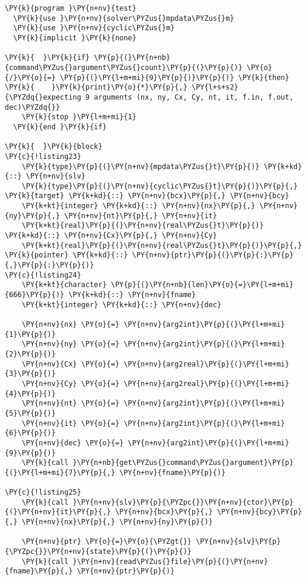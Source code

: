 \begin{Verbatim}[commandchars=\\\{\}]
\PY{k}{program }\PY{n+nv}{test}
  \PY{k}{use }\PY{n+nv}{solver\PYZus{}mpdata\PYZus{}m}
  \PY{k}{use }\PY{n+nv}{cyclic\PYZus{}m}
  \PY{k}{implicit }\PY{k}{none}

\PY{k}{  }\PY{k}{if} \PY{p}{(}\PY{n+nb}{command\PYZus{}argument\PYZus{}count}\PY{p}{(}\PY{p}{)} \PY{o}{/}\PY{o}{=} \PY{p}{(}\PY{l+m+mi}{9}\PY{p}{)}\PY{p}{)} \PY{k}{then}
\PY{k}{    }\PY{k}{print}\PY{o}{*}\PY{p}{,} \PY{l+s+s2}{\PYZdq{}expecting 9 arguments (nx, ny, Cx, Cy, nt, it, f.in, f.out, dec)\PYZdq{}}
    \PY{k}{stop }\PY{l+m+mi}{1}
  \PY{k}{end }\PY{k}{if}

\PY{k}{  }\PY{k}{block}
\PY{c}{!listing23}
    \PY{k}{type}\PY{p}{(}\PY{n+nv}{mpdata\PYZus{}t}\PY{p}{)} \PY{k+kd}{::} \PY{n+nv}{slv}
    \PY{k}{type}\PY{p}{(}\PY{n+nv}{cyclic\PYZus{}t}\PY{p}{)}\PY{p}{,} \PY{k}{target} \PY{k+kd}{::} \PY{n+nv}{bcx}\PY{p}{,} \PY{n+nv}{bcy}
    \PY{k+kt}{integer} \PY{k+kd}{::} \PY{n+nv}{nx}\PY{p}{,} \PY{n+nv}{ny}\PY{p}{,} \PY{n+nv}{nt}\PY{p}{,} \PY{n+nv}{it}
    \PY{k+kt}{real}\PY{p}{(}\PY{n+nv}{real\PYZus{}t}\PY{p}{)} \PY{k+kd}{::} \PY{n+nv}{Cx}\PY{p}{,} \PY{n+nv}{Cy}
    \PY{k+kt}{real}\PY{p}{(}\PY{n+nv}{real\PYZus{}t}\PY{p}{)}\PY{p}{,} \PY{k}{pointer} \PY{k+kd}{::} \PY{n+nv}{ptr}\PY{p}{(}\PY{p}{:}\PY{p}{,}\PY{p}{:}\PY{p}{)}
\PY{c}{!listing24}
    \PY{k+kt}{character} \PY{p}{(}\PY{n+nb}{len}\PY{o}{=}\PY{l+m+mi}{666}\PY{p}{)} \PY{k+kd}{::} \PY{n+nv}{fname}
    \PY{k+kt}{integer} \PY{k+kd}{::} \PY{n+nv}{dec}

    \PY{n+nv}{nx} \PY{o}{=} \PY{n+nv}{arg2int}\PY{p}{(}\PY{l+m+mi}{1}\PY{p}{)}
    \PY{n+nv}{ny} \PY{o}{=} \PY{n+nv}{arg2int}\PY{p}{(}\PY{l+m+mi}{2}\PY{p}{)}
    \PY{n+nv}{Cx} \PY{o}{=} \PY{n+nv}{arg2real}\PY{p}{(}\PY{l+m+mi}{3}\PY{p}{)}
    \PY{n+nv}{Cy} \PY{o}{=} \PY{n+nv}{arg2real}\PY{p}{(}\PY{l+m+mi}{4}\PY{p}{)}
    \PY{n+nv}{nt} \PY{o}{=} \PY{n+nv}{arg2int}\PY{p}{(}\PY{l+m+mi}{5}\PY{p}{)}
    \PY{n+nv}{it} \PY{o}{=} \PY{n+nv}{arg2int}\PY{p}{(}\PY{l+m+mi}{6}\PY{p}{)}
    \PY{n+nv}{dec} \PY{o}{=} \PY{n+nv}{arg2int}\PY{p}{(}\PY{l+m+mi}{9}\PY{p}{)}
    \PY{k}{call }\PY{n+nb}{get\PYZus{}command\PYZus{}argument}\PY{p}{(}\PY{l+m+mi}{7}\PY{p}{,} \PY{n+nv}{fname}\PY{p}{)}

\PY{c}{!listing25}
    \PY{k}{call }\PY{n+nv}{slv}\PY{p}{\PYZpc{}}\PY{n+nv}{ctor}\PY{p}{(}\PY{n+nv}{it}\PY{p}{,} \PY{n+nv}{bcx}\PY{p}{,} \PY{n+nv}{bcy}\PY{p}{,} \PY{n+nv}{nx}\PY{p}{,} \PY{n+nv}{ny}\PY{p}{)}

    \PY{n+nv}{ptr} \PY{o}{=}\PY{o}{\PYZgt{}} \PY{n+nv}{slv}\PY{p}{\PYZpc{}}\PY{n+nv}{state}\PY{p}{(}\PY{p}{)} 
    \PY{k}{call }\PY{n+nv}{read\PYZus{}file}\PY{p}{(}\PY{n+nv}{fname}\PY{p}{,} \PY{n+nv}{ptr}\PY{p}{)}


\end{Verbatim}
